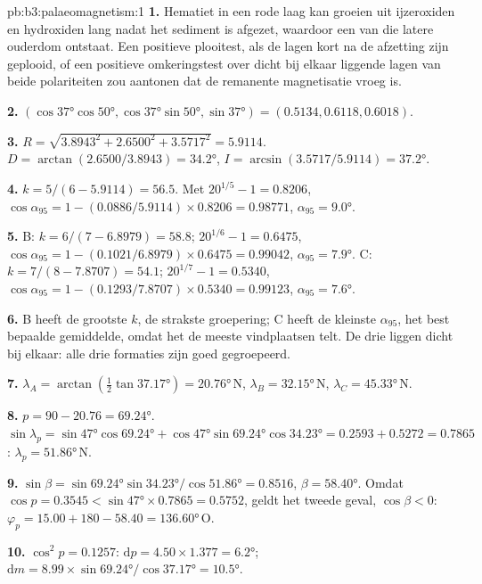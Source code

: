 \begin{solution}{pb:b3:palaeomagnetism:1}
\textbf{1.} Hematiet in een rode laag kan groeien uit ijzeroxiden en hydroxiden
lang nadat het sediment is afgezet, waardoor een  van die
latere ouderdom ontstaat. Een positieve plooitest, als de lagen kort na
de afzetting zijn geplooid, of een positieve omkeringstest over dicht bij elkaar
liggende lagen van beide polariteiten zou aantonen dat de remanente magnetisatie vroeg is.

\textbf{2.} $(\cos\ang{37}\cos\ang{50}, \cos\ang{37}\sin\ang{50}, \sin\ang{37})
= (0.5134, 0.6118, 0.6018)$.

\textbf{3.} $R = \sqrt{3.8943^2 + 2.6500^2 + 3.5717^2} = 5.9114$. $D =
\arctan(2.6500/3.8943) = \ang{34.2}$, $I = \arcsin(3.5717/5.9114) = \ang{37.2}$.

\textbf{4.} $k = 5/(6 - 5.9114) = 56.5$. Met $20^{1/5} - 1 = 0.8206$,
$\cos\alpha_{95} = 1 - (0.0886/5.9114)\times0.8206 = 0.98771$, $\alpha_{95} =
\ang{9.0}$.

\textbf{5.} B: $k = 6/(7 - 6.8979) = 58.8$; $20^{1/6} - 1 = 0.6475$,
$\cos\alpha_{95} = 1 - (0.1021/6.8979)\times0.6475 = 0.99042$, $\alpha_{95} =
\ang{7.9}$. C: $k = 7/(8 - 7.8707) = 54.1$; $20^{1/7} - 1 = 0.5340$,
$\cos\alpha_{95} = 1 - (0.1293/7.8707)\times0.5340 = 0.99123$, $\alpha_{95} =
\ang{7.6}$.

\textbf{6.} B heeft de grootste $k$, de strakste groepering; C heeft de kleinste
$\alpha_{95}$, het best bepaalde gemiddelde, omdat het de meeste vindplaatsen telt. De drie
liggen dicht bij elkaar: alle drie formaties zijn goed gegroepeerd.

\textbf{7.} $\lambda_A = \arctan(\tfrac12\tan\ang{37.17}) = \ang{20.76}$\,N,
$\lambda_B = \ang{32.15}$\,N, $\lambda_C = \ang{45.33}$\,N.

\textbf{8.} $p = 90 - 20.76 = \ang{69.24}$. $\sin\lambda_p =
\sin\ang{47}\cos\ang{69.24} + \cos\ang{47}\sin\ang{69.24}\cos\ang{34.23} =
0.2593 + 0.5272 = 0.7865$: $\lambda_p = \ang{51.86}$\,N.

\textbf{9.} $\sin\beta = \sin\ang{69.24}\sin\ang{34.23}/\cos\ang{51.86} =
0.8516$, $\beta = \ang{58.40}$. Omdat $\cos p = 0.3545 < \sin\ang{47}\times
0.7865 = 0.5752$, geldt het tweede geval, $\cos\beta < 0$:
$\varphi_p = 15.00 + 180 - 58.40 = \ang{136.60}$\,O.

\textbf{10.} $\cos^2p = 0.1257$: $\mathrm dp = 4.50\times1.377 = \ang{6.2}$;
$\mathrm dm = 8.99\times\sin\ang{69.24}/\cos\ang{37.17} = \ang{10.5}$.


\end{solution}
